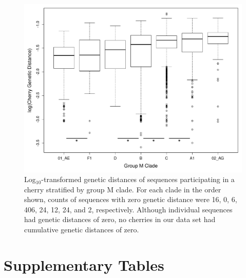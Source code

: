 \documentclass[12pt]{article}
\begin{document}
\begin{figure}[htbp]
    \centering
    \includegraphics[width=.95\textwidth, trim={3mm, 0mm, 0mm, 0mm}, clip]{boxplot_logGD.pdf}
    \caption{ Log$_{10}$-transformed genetic distances of sequences participating in a cherry stratified by group M clade. 
    For each clade in the order shown, counts of sequences with zero genetic distance were 16, 0, 6, 406, 24, 12, 24, and 2, respectively. 
    Although individual sequences had genetic distances of zero, no cherries in our data set had cumulative genetic distances of zero.}
    \label{boxplot_GD}
\end{figure}

\clearpage

\section * {Supplementary Tables}
\end{document}
